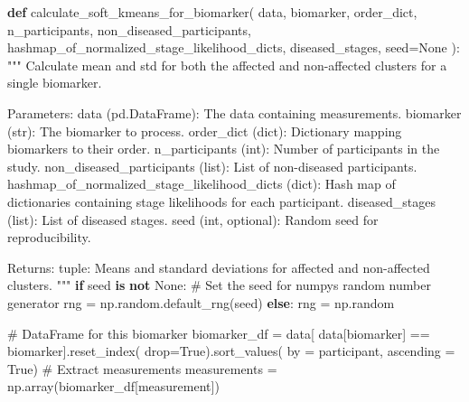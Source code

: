\documentclass[
  letterpaper,
  DIV=11,
  numbers=noendperiod]{scrreprt}
\newenvironment{Shaded}{\begin{snugshade}}{\end{snugshade}}
\newcommand{\CommentTok}[1]{\textcolor[rgb]{0.37,0.37,0.37}{#1}}
\newcommand{\ControlFlowTok}[1]{\textcolor[rgb]{0.00,0.23,0.31}{\textbf{#1}}}
\newcommand{\KeywordTok}[1]{\textcolor[rgb]{0.00,0.23,0.31}{\textbf{#1}}}
\newcommand{\NormalTok}[1]{\textcolor[rgb]{0.00,0.23,0.31}{#1}}
\newcommand{\OperatorTok}[1]{\textcolor[rgb]{0.37,0.37,0.37}{#1}}
\newcommand{\StringTok}[1]{\textcolor[rgb]{0.13,0.47,0.30}{#1}}
\newcommand{\VariableTok}[1]{\textcolor[rgb]{0.07,0.07,0.07}{#1}}
\begin{document}
\begin{Shaded}
\begin{Highlighting}[]
\KeywordTok{def}\NormalTok{ calculate\_soft\_kmeans\_for\_biomarker(}
\NormalTok{        data,}
\NormalTok{        biomarker,}
\NormalTok{        order\_dict,}
\NormalTok{        n\_participants,}
\NormalTok{        non\_diseased\_participants,}
\NormalTok{        hashmap\_of\_normalized\_stage\_likelihood\_dicts,}
\NormalTok{        diseased\_stages,}
\NormalTok{        seed}\OperatorTok{=}\VariableTok{None}
\NormalTok{):}
    \CommentTok{"""}
\CommentTok{    Calculate mean and std for both the affected and non{-}affected clusters for a single biomarker.}

\CommentTok{    Parameters:}
\CommentTok{        data (pd.DataFrame): The data containing measurements.}
\CommentTok{        biomarker (str): The biomarker to process.}
\CommentTok{        order\_dict (dict): Dictionary mapping biomarkers to their order.}
\CommentTok{        n\_participants (int): Number of participants in the study.}
\CommentTok{        non\_diseased\_participants (list): List of non{-}diseased participants.}
\CommentTok{        hashmap\_of\_normalized\_stage\_likelihood\_dicts (dict): Hash map of }
\CommentTok{            dictionaries containing stage likelihoods for each participant.}
\CommentTok{        diseased\_stages (list): List of diseased stages.}
\CommentTok{        seed (int, optional): Random seed for reproducibility.}

\CommentTok{    Returns:}
\CommentTok{        tuple: Means and standard deviations for affected and non{-}affected clusters.}
\CommentTok{    """}
    \ControlFlowTok{if}\NormalTok{ seed }\KeywordTok{is} \KeywordTok{not} \VariableTok{None}\NormalTok{:}
        \CommentTok{\# Set the seed for numpy\textquotesingle{}s random number generator}
\NormalTok{        rng }\OperatorTok{=}\NormalTok{ np.random.default\_rng(seed)}
    \ControlFlowTok{else}\NormalTok{:}
\NormalTok{        rng }\OperatorTok{=}\NormalTok{ np.random }

    \CommentTok{\# DataFrame for this biomarker}
\NormalTok{    biomarker\_df }\OperatorTok{=}\NormalTok{ data[}
\NormalTok{        data[}\StringTok{\textquotesingle{}biomarker\textquotesingle{}}\NormalTok{] }\OperatorTok{==}\NormalTok{ biomarker].reset\_index(}
\NormalTok{            drop}\OperatorTok{=}\VariableTok{True}\NormalTok{).sort\_values(}
\NormalTok{                by }\OperatorTok{=} \StringTok{\textquotesingle{}participant\textquotesingle{}}\NormalTok{, ascending }\OperatorTok{=} \VariableTok{True}\NormalTok{)}
    \CommentTok{\# Extract measurements}
\NormalTok{    measurements }\OperatorTok{=}\NormalTok{ np.array(biomarker\_df[}\StringTok{\textquotesingle{}measurement\textquotesingle{}}\NormalTok{])}


\end{Highlighting}
\end{Shaded}
\end{document}
